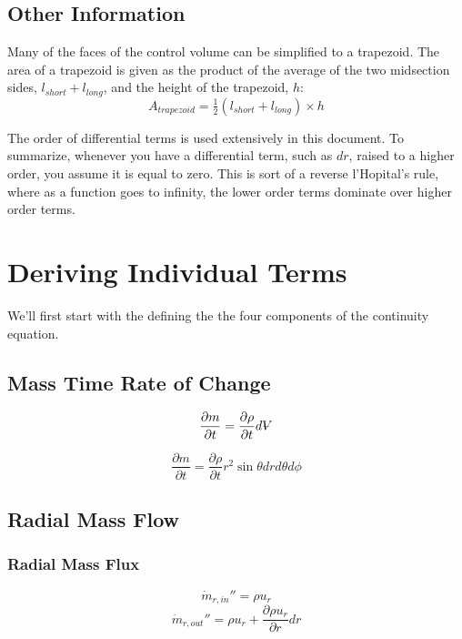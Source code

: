 \documentclass[12pt, letterpaper, twoside]{article}
\makeatletter
\DeclareRobustCommand{\volume}{\text{\volumedash}V}
\newcommand{\volumedash}{%
  \makebox[0pt][l]{%
    \ooalign{\hfil\hphantom{$\m@th V$}\hfil\cr\kern0.08em--\hfil\cr}%
  }%
}
\makeatother
\begin{document}
\subsection{Other Information}\label{sect:otherinfo}
Many of the faces of the control volume can be simplified to a trapezoid. The area of a trapezoid is given as the product of the average of the two midsection sides, \(l_{short} + l_{long}\), and the height of the trapezoid, \(h\):
%
\begin{equation}\label{eq:traparea}
    A_{trapezoid} = \tfrac{1}{2} (l_{short} + l_{long}) \times h
\end{equation}

The order of differential terms is used extensively in this document. To summarize, whenever you have a differential term, such as \(dr\), raised to a higher order, you assume it is equal to zero. This is sort of a reverse l'Hopital's rule, where as a function goes to infinity, the lower order terms dominate over higher order terms.

\section{Deriving Individual Terms} \label{sect:deriveterms}
We'll first start with the defining the the four components of the continuity equation.

    \subsection{Mass Time Rate of Change}
        \begin{equation*}
            \frac{\partial m}{\partial t} = \frac{\partial \rho}{\partial t}d\volume
        \end{equation*}

        \begin{equation}\label{eq:dm/dt}
            \boxed{\frac{\partial m}{\partial t} = 
            \frac{\partial \rho}{\partial t} r^2 \sin\theta dr d\theta d\phi}
        \end{equation}

    \subsection{Radial Mass Flow}
        \subsubsection{Radial Mass Flux}
            \begin{equation}
                \dot{m}_{r,in}'' = \rho u_r
            \end{equation}
            \begin{equation}
                \dot{m}_{r,out}'' = \rho u_r  +
                \frac{\partial \rho u_r}{\partial r} dr
            \end{equation}
\end{document}

